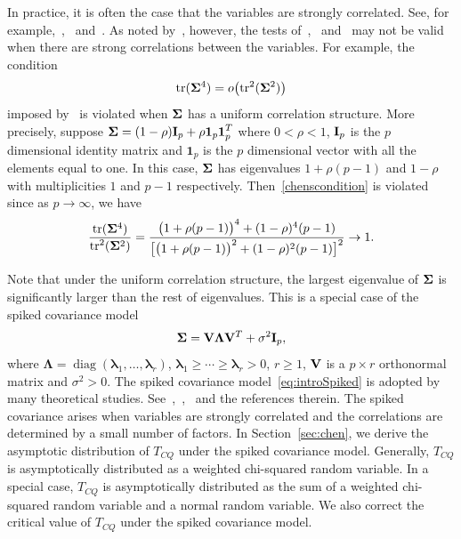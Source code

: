\documentclass[review]{elsarticle}
\DeclareMathOperator{\mytr}{tr}
\DeclareMathOperator{\mydiag}{diag}
\newcommand{\bfsym}[1]{\ensuremath{\boldsymbol{#1}}}
\def\blambda {\bfsym {\lambda}}        \def\bLambda {\bfsym {\Lambda}}
\theoremstyle{plain}
\theoremstyle{definition}
\theoremstyle{remark}
\begin{document}
In practice, it is often the case that the variables are strongly correlated.
See, for example,~\cite{Chen2011A},~\cite{Thulin2014A} and~\cite{Ma2015A}.
As noted by~\cite{Ma2015A}, however, the tests of~\cite{Bai1996Efiect},~\cite{Srivastava2008A} and~\cite{Chen2010A} may not be valid when there are strong correlations between the variables.
For example, the condition 
\begin{equation}\label{chenscondition}
    \mathrm{tr}(\bSigma^4)=o\big(\mathrm{tr}^2(\bSigma^2)\big)
\end{equation}
imposed by~\cite{Chen2010A} is violated when $\bSigma$ has a uniform correlation structure.
More precisely, suppose
$\bSigma=(1-\rho)\BI_p+\rho\textbf{1}_p \textbf{1}_p^T$ where $0<\rho<1$, $\mathbf{I}_p$ is the $p$ dimensional identity matrix and $\bm{1}_p$ is the $p$ dimensional vector with all the elements equal to one.
In this case, $\bSigma$ has eigenvalues $1+\rho(p-1) $ and $1-\rho$ with multiplicities $1$ and $p-1$ respectively. Then~\eqref{chenscondition} is violated since 
as $p\to \infty$, we have
$$
\frac{\mytr (\bSigma^4)}{\mytr^2(\bSigma^2)}=\frac{\big(1+\rho(p-1)\big)^4 + (1-\rho)^4 (p-1)}{\big[ \big(1+\rho(p-1)\big)^2+(1-\rho)^2 (p-1) \big]^2}\to 1.
$$

  Note that under the uniform correlation structure, the largest eigenvalue of $\bSigma$ is significantly larger than the rest of eigenvalues.
  This is a special case of the spiked covariance model
 \begin{equation}\label{eq:introSpiked}
 \bSigma =\BV\bLambda \BV^T +\sigma^2 \BI_p,
 \end{equation}
 where $\bLambda=\mydiag(\blambda_1,\ldots,\blambda_r)$, $\blambda_1\geq \cdots\geq \blambda_r>0$, $r\geq 1$, $\mathbf{V}$ is a $p\times r$ orthonormal matrix and $\sigma^2>0$.
The spiked covariance model~\eqref{eq:introSpiked} is adopted by many theoretical studies. See~\cite{Cai2012Sparse},~\cite{Birnbaum2013},~\cite{Passemier2015} and the references therein.
The spiked covariance arises when variables are strongly correlated and the correlations are determined by a small number of factors.
 In Section~\ref{sec:chen}, we derive the asymptotic distribution of $T_{CQ}$ under the spiked covariance model. 
Generally, $T_{CQ}$ is asymptotically distributed as a weighted chi-squared random variable.
In a special case, $T_{CQ}$ is asymptotically distributed as the sum of a weighted chi-squared random variable and a normal random variable. 
We also correct the critical value of $T_{CQ}$ under the spiked covariance model.
\end{document}
